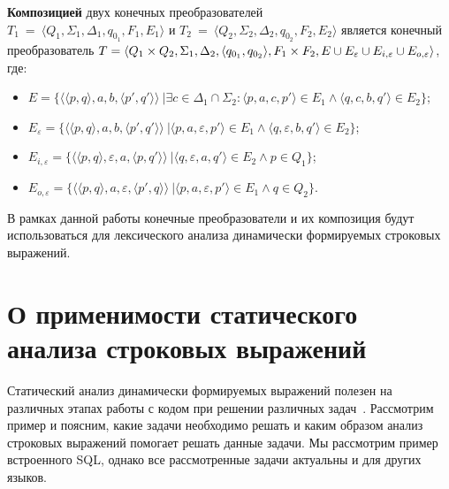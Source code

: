 \begin{mydef}

\textbf{Композицией} двух конечных преобразователей \\  $T_1~=~\langle Q_1, \Sigma_1, \Delta_1, q_{0_{1}}, F_1, E_1 \rangle$ и $T_2~=~\langle Q_2, \Sigma_2, \Delta_2, q_{0_{2}}, F_2, E_2 \rangle$ является конечный преобразователь  $T =\langle Q_1  \times Q_2, \Sigma_1, \Delta_2, \\ \langle q_{0_{1}}, q_{0_{2}} \rangle, F_1 \times F_2, E \cup E_{\varepsilon} \cup E_{i,\varepsilon} \cup E_{o,\varepsilon} \rangle$, где: 

\begin{itemize}
\item $E = \{ \langle \langle p, q \rangle, a, b, \langle p', q' \rangle \rangle\ | \exists c \in \Delta_1 \cap \Sigma_2 : \langle p, a, c, p' \rangle \in E_1 \wedge \langle q, c, b, q' \rangle \in E_2\}$;
\item $E_{\varepsilon} = \{ \langle \langle p, q \rangle, a, b, \langle p', q' \rangle \rangle\ | \langle p, a, {\varepsilon}, p' \rangle \in E_1 \wedge \langle q, {\varepsilon}, b, q' \rangle \in E_2\}$;
\item $E_{i, \varepsilon} = \{ \langle \langle p, q \rangle, {\varepsilon}, a, \langle p, q' \rangle \rangle\ | \langle q, {\varepsilon}, a, q' \rangle \in E_2 \wedge p \in Q_1 \} $;
\item $E_{o, \varepsilon} = \{ \langle \langle p, q \rangle,  a, {\varepsilon}, \langle p', q \rangle \rangle\ | \langle p, a, {\varepsilon}, p' \rangle \in E_1 \wedge q \in Q_2 \}. $
\end{itemize}
\end{mydef}

В рамках данной работы конечные преобразователи и их композиция будут использоваться для лексического анализа динамически формируемых строковых выражений.

\section{О применимости статического анализа строковых выражений}

Статический анализ динамически формируемых выражений полезен на различных этапах работы с кодом при решении различных задач~\cite{DevelopmentDSQLTools}. Рассмотрим пример и поясним, какие задачи необходимо решать и каким образом анализ строковых выражений помогает решать данные задачи. Мы рассмотрим пример встроенного SQL, однако все рассмотренные задачи актуальны и для других языков.

